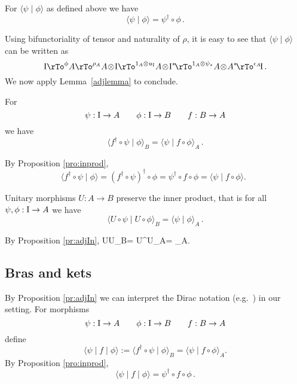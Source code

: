 \documentclass[10pt]{article}
\begin{document}
\begin{proposition}\label{pro:inprod}
For $\langle \psi \mid \phi \rangle$ as defined above we have 
\[ 
\langle \psi \mid \phi \rangle = \psi^{\dagger}\circ \phi\,. 
\]
\end{proposition}
\bpf
Using bifunctoriality of tensor and naturality of $\rho$, it is easy to see that $\langle \psi  \mid \phi \rangle$ can be
written as
\[
\II  \rTo^{\phi}  A  \rTo^{\rho_A}  A\! \otimes\! \II  \rTo^{1_A \otimes u_{\II}}  A\! \otimes\!
\II^*\!  \rTo^{1_A \otimes \psi_*}  A\! \otimes\! A^*\!  \rTo^{\epsilon_A}\!  \II\,.
\]
We now apply Lemma~\ref{adjlemma} to conclude. 
\hfill\endproof\newline


\begin{proposition}\label{pr:adjIn}
For
\[
\psi:{\rm I}\to A\qquad \phi:{\rm I}\to B\qquad f:B\to A 
\]
we have 
\[
\langle f^\dagger\circ\psi\mid\phi\rangle_B=\langle \psi\mid f\circ\phi\rangle_A\,.
\]
\end{proposition}
\bpf
By Proposition \ref{pro:inprod},
\[
\langle
f^\dagger\!\circ\psi\mid\phi\rangle=(f^\dagger\!\circ\psi)^\dagger\!\circ\phi=
\psi^\dagger\!\circ f\circ\phi=\langle \psi\mid 
f\circ\phi\rangle. \ \ 
\]
\vspace{-11.0mm} 

\hfill\endproof

\begin{proposition}\label{pr:UnIn}
Unitary morphisms $U:A\to B$ preserve the inner product, that is  
for all $\psi,\phi:{\rm I}\to A$ we have 
\[
\langle U\circ\psi\mid U\circ\phi\rangle_B=
\langle \psi\mid \phi\rangle_A\,.
\]
\end{proposition}
\bpf
By Proposition \ref{pr:adjIn},
\beqa
\langle U\circ\psi\mid U\circ\phi\rangle_B=
\langle U^\dagger\!\circ U\circ\psi\mid \phi\rangle_A=
\langle \psi\mid \phi\rangle_A.
\eeqa
\vspace{-11.0mm} 

\hfill\endproof

\subsection{Bras and kets}

By Proposition \ref{pr:adjIn} we can interpret the Dirac notation
(e.g.~\cite{Nielsen}) in our setting. For morphisms
\[
\psi:\II\to A\qquad \phi:\II\to B\qquad f:B\to A 
\]
define
\[
\langle \psi \mid f \mid \phi \rangle:=\langle
f^\dagger\circ\psi\mid\phi\rangle_B=\langle \psi\mid f\circ\phi\rangle_A .
\]
By Proposition \ref{pro:inprod},
\[ 
\langle \psi \mid f \mid \phi \rangle = \psi^{\dagger} \circ f \circ \phi\,. 
\]
\end{document}
